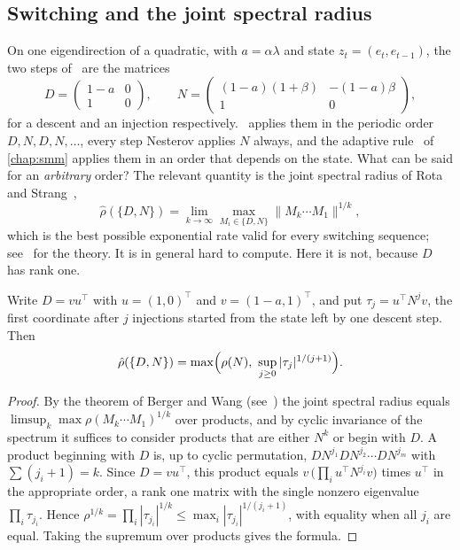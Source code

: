 \subsection{Switching and the joint spectral radius}

On one eigendirection of a quadratic, with $a=\alpha\lambda$ and state
$z_t=(e_t,e_{t-1})$, the two steps of \smmdet\ are the matrices
\[
  D=\begin{pmatrix}1-a&0\\1&0\end{pmatrix},\qquad
  N=\begin{pmatrix}(1-a)(1+\beta)&-(1-a)\beta\\1&0\end{pmatrix},
\]
for a descent and an injection respectively. \smmdet\ applies them in the
periodic order $D,N,D,N,\dots$, every step Nesterov applies $N$ always, and the
adaptive rule \smmstate\ of \cref{chap:smm} applies them in an order that depends on the state.
What can be said for an \emph{arbitrary} order? The relevant quantity is the
joint spectral radius of Rota and Strang~\cite{rota1960},
\[
  \hat\rho(\{D,N\})=\lim_{k\to\infty}\max_{M_i\in\{D,N\}}
  \|M_k\cdots M_1\|^{1/k},
\]
which is the best possible exponential rate valid for every switching sequence;
see~\cite{jungers2009} for the theory. It is in general hard to compute. Here it
is not, because $D$ has rank one.

\begin{proposition}\label{prop:ch5b:jsr}
Write $D=vu^\top$ with $u=(1,0)^\top$ and $v=(1-a,1)^\top$, and put
$\tau_j=u^\top N^jv$, the first coordinate after $j$ injections started from
the state left by one descent step. Then
\[
  \hat\rho(\{D,N\})=\max\Bigl(\rho(N),\ \sup_{j\ge0}|\tau_j|^{1/(j+1)}\Bigr).
\]
\end{proposition}

\begin{proof}
By the theorem of Berger and Wang (see~\cite{jungers2009}) the joint spectral
radius equals $\limsup_k\max\rho(M_k\cdots M_1)^{1/k}$ over products, and by
cyclic invariance of the spectrum it suffices to consider products that are
either $N^k$ or begin with $D$. A product beginning with $D$ is, up to cyclic
permutation, $DN^{j_1}DN^{j_2}\cdots DN^{j_m}$ with $\sum(j_i+1)=k$. Since
$D=vu^\top$, this product equals $v\,\bigl(\prod_{i}u^\top N^{j_i}v\bigr)$ times
$u^\top$ in the appropriate order, a rank one matrix with the single nonzero
eigenvalue $\prod_i\tau_{j_i}$. Hence $\rho^{1/k}=\prod_i|\tau_{j_i}|^{1/k}\le
\max_i|\tau_{j_i}|^{1/(j_i+1)}$, with equality when all $j_i$ are equal. Taking
the supremum over products gives the formula.
\end{proof}

